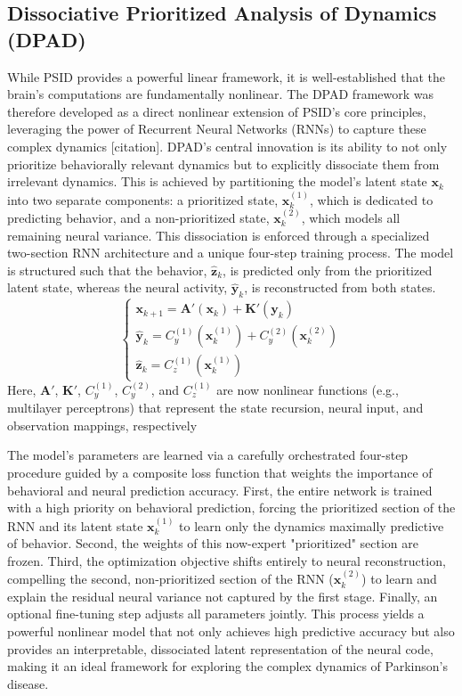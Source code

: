 \documentclass[12pt, a4paper]{article}
\begin{document}
\subsection{Dissociative Prioritized Analysis of Dynamics (DPAD)}

While PSID provides a powerful linear framework, it is well-established that the brain's computations are fundamentally nonlinear. The DPAD framework was therefore developed as a direct nonlinear extension of PSID's core principles, leveraging the power of Recurrent Neural Networks (RNNs) to capture these complex dynamics [citation]. DPAD's central innovation is its ability to not only prioritize behaviorally relevant dynamics but to explicitly dissociate them from irrelevant dynamics. This is achieved by partitioning the model's latent state $\mathbf{x}_k$ into two separate components: a prioritized state, $\mathbf{x}_k^{(1)}$, which is dedicated to predicting behavior, and a non-prioritized state, $\mathbf{x}_k^{(2)}$, which models all remaining neural variance.
This dissociation is enforced through a specialized two-section RNN architecture and a unique four-step training process. The model is structured such that the behavior, $\hat{\mathbf{z}}_k$, is predicted only from the prioritized latent state, whereas the neural activity, $\hat{\mathbf{y}}_k$, is reconstructed from both states. 
$$
\begin{cases}
\mathbf{x}_{k+1} = \mathbf{A}'(\mathbf{x}_k) + \mathbf{K}'(\mathbf{y}_k) \\
\hat{\mathbf{y}}_k = C_y^{(1)}(\mathbf{x}_k^{(1)}) + C_y^{(2)}(\mathbf{x}_k^{(2)}) \\
\hat{\mathbf{z}}_k = C_z^{(1)}(\mathbf{x}_k^{(1)})
\end{cases}
$$
Here, $\mathbf{A}'$, $\mathbf{K}'$, $C_y^{(1)}$, $C_y^{(2)}$, and $C_z^{(1)}$ are now nonlinear functions (e.g., multilayer perceptrons) that represent the state recursion, neural input, and observation mappings, respectively

The model's parameters are learned via a carefully orchestrated four-step procedure guided by a composite loss function that weights the importance of behavioral and neural prediction accuracy. First, the entire network is trained with a high priority on behavioral prediction, forcing the prioritized section of the RNN and its latent state $\mathbf{x}_k^{(1)}$ to learn only the dynamics maximally predictive of behavior. Second, the weights of this now-expert "prioritized" section are frozen. Third, the optimization objective shifts entirely to neural reconstruction, compelling the second, non-prioritized section of the RNN ($\mathbf{x}_k^{(2)}$) to learn and explain the residual neural variance not captured by the first stage. Finally, an optional fine-tuning step adjusts all parameters jointly. This process yields a powerful nonlinear model that not only achieves high predictive accuracy but also provides an interpretable, dissociated latent representation of the neural code, making it an ideal framework for exploring the complex dynamics of Parkinson's disease.
\end{document}

